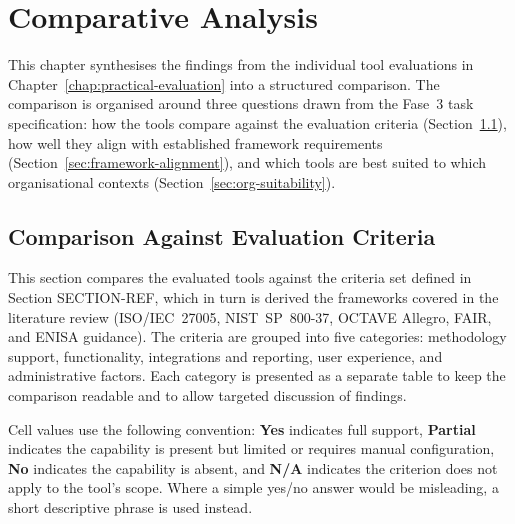 \section{Comparative Analysis}
\label{chap:comparative}

This chapter synthesises the findings from the individual tool evaluations in
Chapter~\ref{chap:practical-evaluation} into a structured comparison. The
comparison is organised around three questions drawn from the Fase~3 task
specification: how the tools compare against the evaluation criteria
(Section~\ref{sec:eval-criteria-comparison}), how well they align with
established framework requirements (Section~\ref{sec:framework-alignment}),
and which tools are best suited to which organisational contexts
(Section~\ref{sec:org-suitability}).

\subsection{Comparison Against Evaluation Criteria}
\label{sec:eval-criteria-comparison}

This section compares the evaluated tools against the criteria set defined in
Section SECTION-REF, %
which in turn is derived the frameworks covered in the literature review (ISO/IEC~27005,
NIST~SP~800-37, OCTAVE Allegro, FAIR, and ENISA guidance). The criteria are
grouped into five categories: methodology support, functionality,
integrations and reporting, user experience, and administrative factors.
Each category is presented as a separate table to keep the comparison
readable and to allow targeted discussion of findings.

Cell values use the following convention: \textbf{Yes} indicates full
support, \textbf{Partial} indicates the capability is present but limited or
requires manual configuration, \textbf{No} indicates the capability is
absent, and \textbf{N/A} indicates the criterion does not apply to the
tool's scope. Where a simple yes/no answer would be misleading, a short
descriptive phrase is used instead.

